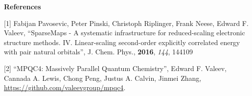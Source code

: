 \documentclass[12pt]{article}
\begin{document}


\vspace{12pt}

\vspace{12pt}

\parindent=0pt
{\bf References}

[1] Fabijan Pavosevic, Peter Pinski, Christoph Riplinger, Frank Neese, Edward F.
Valeev, ``SparseMaps - A systematic infrastructure for reduced-scaling
electronic structure methods. IV. Linear-scaling second-order explicitly
correlated energy with pair natural orbitals'', J. Chem. Phys., {\bf 2016},
{\em 144}, 144109

[2] ``MPQC4: Massively Parallel Quantum Chemistry'', Edward F. Valeev, Cannada 
A. Lewis, Chong Peng, Justus A. Calvin, Jinmei Zhang,
\url{https://github.com/valeevgroup/mpqc4}.
\end{document}
